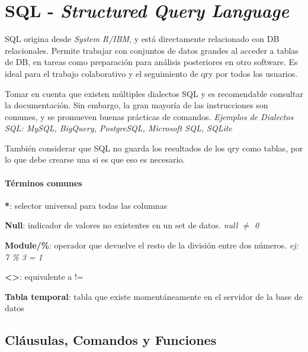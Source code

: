 
\section{SQL - \textit{Structured Query Language}}
SQL origina desde \textit{System R/IBM}, y está directamente relacionado con DB relacionales. Permite trabajar con conjuntos de datos grandes al acceder a tablas de DB, en tareas como preparación para análisis posteriores en otro software. Es ideal para el trabajo colaborativo y el seguimiento de \gls{qry} por todos los usuarios.

Tomar en cuenta que existen múltiples dialectos SQL y es recomendable consultar la documentación. Sin embargo, la gran mayoría de las instrucciones son comunes, y se promueven buenas prácticas de comandos. \textit{Ejemplos de Dialectos SQL: MySQL, BigQuery, PostgreSQL, Microsoft SQL, SQLite}

También considerar que SQL no guarda los resultados de los \gls{qry} como tablas, por lo que debe crearse una si es que eso es necesario.

\paragraph{Términos comunes}
\begin{description}
    \item {\textbf{*}: selector universal para todas las columnas}
    \item {\textbf{Null}: indicador de valores no existentes en un set de datos. \textit{null ${\neq}$ 0}} 
    \item {\textbf{Module/\%}: operador que devuelve el resto de la división entre dos números. \textit{ej: 7 \% 3 = 1}}
    \item {\textbf{<>}: equivalente a !=}
    \item {\textbf{Tabla temporal}: tabla que existe momentáneamente en el servidor de la base de datos}
    
\end{description}

\subsection{Cláusulas, Comandos y Funciones}
